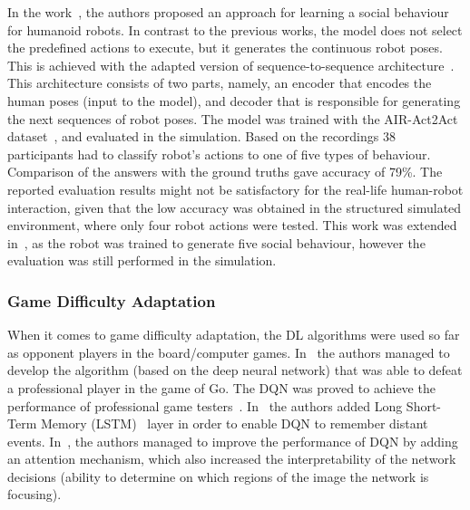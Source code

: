 \documentclass[thesis]{mas_proposal}
\begin{document}
In the work~\cite{ko2020end}, the authors proposed an approach for learning a social behaviour for humanoid robots. In contrast to the previous works, the model does not select the predefined actions to execute, but it generates the continuous robot poses. This is achieved with the adapted version of sequence-to-sequence architecture~\cite{sutskever2014sequence}. This architecture consists of two parts, namely, an encoder that encodes the human poses (input to the model), and decoder that is responsible for generating the next sequences of robot poses. The model was trained with the AIR-Act2Act dataset~\cite{Ko2021}, and evaluated in the simulation. Based on the recordings 38 participants had to classify robot's actions to one of five types of behaviour. Comparison of the answers with the ground truths gave accuracy of 79\%. The reported evaluation results might not be satisfactory for the real-life human-robot interaction, given that the low accuracy was obtained in the structured simulated environment, where only four robot actions were tested. This work was extended in~\cite{ko2022nonverbal}, as the robot was trained to generate five social behaviour, however the evaluation was still performed in the simulation. 

\subsubsection{Game Difficulty Adaptation}
When it comes to game difficulty adaptation, the DL algorithms were used so far as opponent players in the board/computer games. In~\cite{Silver2016} the authors managed to develop the algorithm (based on the deep neural network) that was able to defeat a professional player in the game of Go. The DQN was proved to achieve the performance of professional game testers~\cite{mnih2015human}. In~\cite{hausknecht2015deep} the authors added Long Short-Term Memory (LSTM)~\cite{hochreiter1997long} layer in order to enable DQN to remember distant events. In~\cite{sorokin2015deep}, the authors managed to improve the performance of DQN by adding an attention mechanism, which also increased the interpretability of the network decisions (ability to determine on which regions of the image the network is focusing). 
\end{document}
